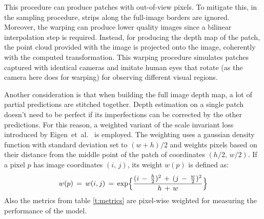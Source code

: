 This procedure can produce patches with out-of-view pixels.
To mitigate this, in the sampling procedure, strips along the full-image borders are ignored.
Moreover, the warping can produce lower quality images since a bilinear interpolation step is required.
Instead, for producing the depth map of the patch, the point cloud provided with the image is projected onto the image, coherently with the computed transformation.
This warping procedure simulates patches captured with identical cameras and imitate human eyes that rotate (as the camera here does for warping) for observing different visual regions.

Another consideration is that when building the full image depth map, a lot of partial predictions are stitched together.
Depth estimation on a single patch doesn't need to be perfect if its imperfections can be corrected by the other predictions.
For this reason, a weighted variant of the scale invariant loss introduced by Eigen~et~al.~\cite{Eigen} is employed.
The weighting uses a gaussian density function with standard deviation set to $(w + h) / 2$ and weights pixels based on their distance from the middle point of the patch of coordinates $(h/2, \, w/2)$.
If a pixel $p$ has image coordinates $(i, \, j)$, its weight $w(p)$ is defined as:
\[
    w(p) \, = \, w(i, j) \, = \,
    \text{exp} \Bigl\{
        \frac{
            (i \, - \, \frac{h}{2})^{2} \, + \,
            (j \, - \, \frac{w}{2})^{2}
        }{
            h \, + \, w
        }
    \Bigr\}
\]
Also the metrics from table \ref{t:metrics} are pixel-wise weighted for measuring the performance of the model.

